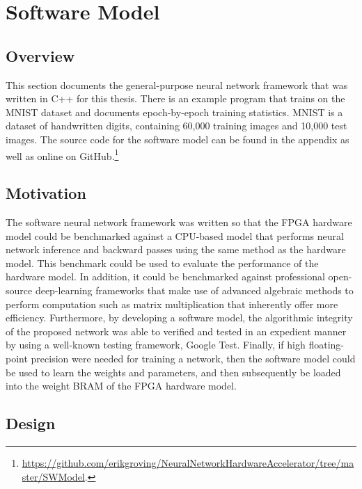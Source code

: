 \chapter{Software Model}
\label{ch-sw-model}
\section{Overview}
This section documents the general-purpose neural network framework that was written in C++ for this thesis. There is an example program that trains on the MNIST dataset and documents epoch-by-epoch training statistics. MNIST is a dataset of handwritten digits, containing 60,000 training images and 10,000 test images. The source code for the software model can be found in the appendix as well as online on GitHub.\footnote{\url{
https://github.com/erikgroving/NeuralNetworkHardwareAccelerator/tree/master/SWModel}.}


\section{Motivation}
The software neural network framework was written so that the FPGA hardware model could be benchmarked against a CPU-based model that performs neural network inference and backward passes using the same method as the hardware model. This benchmark could be used to evaluate the performance of the hardware model. In addition, it could be benchmarked against professional open-source deep-learning frameworks that make use of advanced algebraic methods to perform computation such as matrix multiplication that inherently offer more efficiency. Furthermore, by developing a software model, the algorithmic integrity of the proposed network was able to verified and tested in an expedient manner by using a well-known testing framework, Google Test. Finally, if high floating-point precision were needed for training a network, then the software model could be used to learn the weights and parameters, and then subsequently be loaded into the weight BRAM of the FPGA hardware model.

\section{Design}
